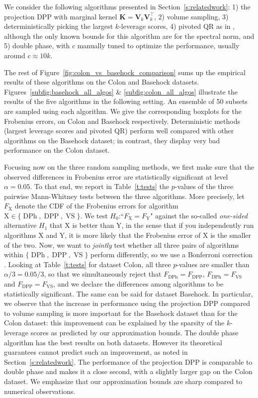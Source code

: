 \documentclass[twoside,11pt]{book}
\numberwithin{theorem}{chapter}
\numberwithin{definition}{chapter}
\numberwithin{proposition}{chapter}
\numberwithin{corollary}{chapter}
\numberwithin{example}{chapter}
\numberwithin{lemma}{chapter}
\numberwithin{assumption}{chapter}
\numberwithin{equation}{chapter}
\numberwithin{figure}{chapter}
\DeclareMathOperator{\DPP}{\mathrm{DPP}}
\DeclareMathOperator{\VS}{\mathrm{VS}}
\DeclareMathOperator{\Tran}{\intercal}
\DeclareMathOperator{\DPh}{\mathrm{DPh}}
\begin{document}
We consider the following algorithms presented in Section~\ref{s:relatedwork}: 1) the projection DPP with marginal kernel $\bm{K}=\bm{V}_{k}^{}\bm{V}_{k}^{\Tran}$, 2) volume sampling, 3) deterministically picking the largest $k$-leverage scores, 4) pivoted QR as in \cite{Golu65}, although the only known bounds for this algorithm are for the spectral norm, and 5) double phase, with $c$ manually tuned to optimize the performance, usually around $c \approx 10k$.

The rest of Figure~\ref{fig:colon_vs_basehock_comparison} sums up the empirical results of these algorithms on the Colon and Basehock datasets.
%
Figures~\ref{subfig:basehock_all_algos} \& \ref{subfig:colon_all_algos} illustrate the results of the five algorithms in the following setting. An ensemble of 50 subsets are sampled using each algorithm. We give the corresponding boxplots for the Frobenius errors, on Colon and Basehock respectively.
%
Deterministic methods (largest leverage scores and pivoted QR) perform well compared with other algorithms on the Basehock dataset; in contrast, they display very bad performance on the Colon dataset.

Focusing now on the three random sampling methods, we first make sure that the observed differences in Frobenius error are statistically significant at level $\alpha=0.05$. To that end, we report in Table~\ref{t:tests} the $p$-values of the three pairwise Mann-Whitney tests between the three algorithms. More precisely, let $F_\text{X}$ denote the CDF of the Frobenius errors for algorithm $\text{X}\in\{\DPh,\DPP,\VS\}$. We test $H_0$:``$F_\text{X}=F_\text{Y}$" against the so-called \emph{one-sided} alternative $H_1$ that X is better than Y, in the sense that if you independently run algorithms X and Y, it is more likely that the Frobenius error of X is the smaller of the two. Now, we want to \emph{jointly} test whether all three pairs of algorithms within $\{\DPh,\DPP,\VS\}$ perform differently, so we use a Bonferroni correction \citep{Was13}. Looking at Table~\ref{t:tests} for dataset Colon, all three $p$-values are smaller than $\alpha/3=0.05/3$, so that we simultaneously reject that $F_{\DPh}=F_{\DPP}$, $F_{\DPh}=F_{\VS}$ and $F_{\DPP}=F_{\VS}$, and we declare the differences among algorithms to be statistically significant. The same can be said for dataset Basehock. In particular, we observe that the increase in performance using the projection DPP compared to volume sampling is more important for the Basehock dataset than for the Colon dataset: this improvement can be explained by the sparsity of the $k$-leverage scores as predicted by our approximation bounds.
%
The double phase algorithm has the best results on both datasets. However its theoretical guarantees cannot predict such an improvement, as noted in Section~\ref{s:relatedwork}. The performance of the projection DPP is comparable to double phase and makes it a close second, with a slightly larger gap on the Colon dataset. We emphasize that our approximation bounds are sharp compared to numerical observations.
\end{document}
